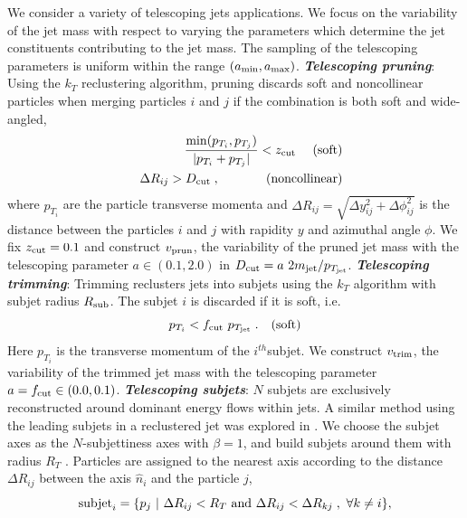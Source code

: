 \documentclass[aps,prl,floatfix,preprintnumbers,twocolumn,groupedaddress,nofootinbib]{revtex4-1}
\newcommand{\be}{\begin{equation}}
\newcommand{\ee}{\end{equation}}
\newcommand{\bea}{\begin{eqnarray}}
\newcommand{\eea}{\end{eqnarray}}
\begin{document}
We consider a variety of telescoping jets applications. We focus on the variability of the jet mass with respect to varying the parameters which determine the jet constituents contributing to the jet mass. The sampling of the telescoping parameters is uniform within the range $(a_{\rm min},a_{\rm max})$.
\newline
\noindent \textit{\textbf{Telescoping pruning}}: Using the $k_T$ reclustering algorithm, pruning discards soft and noncollinear particles when
merging particles $i$ and $j$ if the combination is both soft and wide-angled,
\bea
    &&\frac{{\rm min}(p_{T_i},p_{T_j})}{|p_{T_i}+p_{T_j}|}<z_{\rm cut}~~~~{\rm (soft)}\nonumber\\
    &&\Delta R_{ij} > D_{\rm cut}\;,~~~~~~~~~~~{\rm (noncollinear)}
\eea
where $p_{T_i}$ are the particle transverse momenta and $\Delta R_{ij}=\sqrt{\Delta y_{ij}^2+\Delta \phi_{ij}^2}$ is the distance between the particles $i$ and $j$ with rapidity $y$ and azimuthal angle $\phi$. We fix $z_{\rm cut}=0.1$ and construct $v_{\rm prun}$, the variability of the pruned jet mass with the telescoping parameter $a\in (0.1, 2.0)$ in $D_{\rm cut} = a~ 2m_{\rm jet}/p_{T_{\rm jet}}$. %
\newline
\noindent \textit{\textbf{Telescoping trimming}}: Trimming \cite{Krohn:2009th} reclusters jets into subjets using the $k_T$ algorithm with subjet radius $R_{\rm sub}$. The subjet $i$ is discarded if it is soft, i.e. 
\be
    p_{T_i} < f_{\rm cut}~p_{T_{\rm jet}}\;.~~~{\rm (soft)}
\ee
Here $p_{T_i}$ is the transverse momentum of the $i^{th}$subjet. We construct $v_{\rm trim}$, the variability of the trimmed jet mass with the telescoping parameter $a = f_{\rm cut} \in (0.0, 0.1)$. %
\newline
\noindent \textit{\textbf{Telescoping subjets}}: $N$ subjets are exclusively reconstructed around dominant energy flows within jets. A similar method using the leading subjets in a reclustered jet was explored in \cite{Cui:2010km}. We choose the subjet axes as the $N$-subjettiness axes \cite{Thaler:2010tr} with $\beta = 1$, and build subjets around them with radius $R_T$ \cite{Stewart:2010tn,Chien:2013kca,Stewart:2015waa,Thaler:2015xaa}. Particles are assigned to the nearest axis according to the distance $\Delta R_{ij}$ between the axis $\hat n_i$ and the particle $j$,
\begin{equation}
    {\rm subjet}_{i} = \{p_j~|~\Delta R_{ij}<R_T~{\rm and}~\Delta R_{ij}<\Delta R_{kj}\;,~\forall k\neq i\},
\end{equation}
\end{document}
